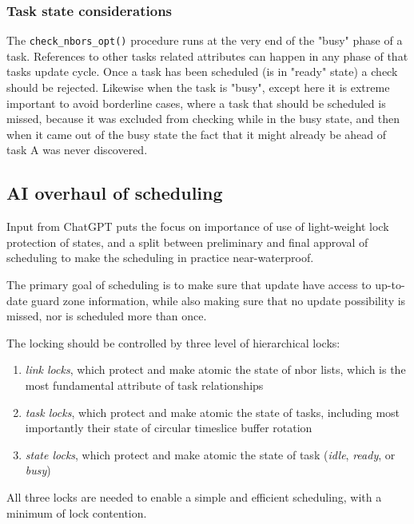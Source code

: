 \documentclass[paper=a4,fontsize=11pt]{scrartcl}
\numberwithin{equation}{section}		%
\numberwithin{figure}{section}			%
\numberwithin{table}{section}				%
\begin{document}
\subsubsection{Task state considerations}
The \verb|check_nbors_opt()| procedure runs at the very end of the "busy" phase of a task.  References to other tasks related attributes can happen in any phase of that tasks update cycle.  Once a task has been scheduled (is in "ready" state) a check should be rejected.  Likewise when the task is "busy", except here it is extreme important to avoid borderline cases, where a task that should be scheduled is missed, because it was excluded from checking while in the busy state, and then when it came out of the busy state the fact that it might already be ahead of task A was never discovered.

\subsection{AI overhaul of scheduling}
Input from ChatGPT puts the focus on importance of use of light-weight lock protection of states, and a split between preliminary and final approval of scheduling to make the scheduling in practice near-waterproof.

The primary goal of scheduling is to make sure that update have access to up-to-date guard zone information, while also making sure that no update possibility is missed, nor is scheduled more than once.

The locking should be controlled by three level of hierarchical locks:
\begin{enumerate}
    \item \textit{link locks}, which protect and make atomic the state of nbor lists, which is the most fundamental attribute of task relationships
    \item \textit{task locks}, which protect and make atomic the state of tasks, including most importantly their state of circular timeslice buffer rotation
    \item \textit{state locks}, which protect and make atomic the state of task (\textit{idle}, \textit{ready}, or \textit{busy})
\end{enumerate}
All three locks are needed to enable a simple and efficient scheduling, with a minimum of lock contention.
\end{document}
